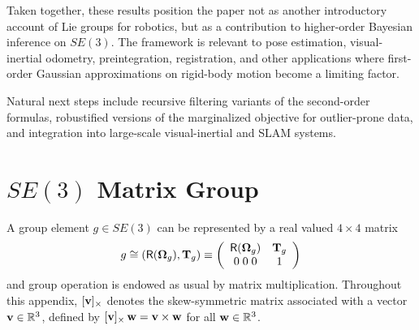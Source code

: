 \documentclass[journal]{IEEEtran}
\newcommand{\real}{\mathbb{R}}
\newcommand{\bfOmega}{\boldsymbol{\Omega}}
\newcommand{\beq}{\begin{equation}}
\newcommand{\eeq}{\end{equation}}
\begin{document}
Taken together, these results position the paper not as another
introductory account of Lie groups for robotics, but as a
contribution to higher-order Bayesian inference on $SE(3)$.
The framework is relevant to pose estimation, visual-inertial
odometry, preintegration, registration, and other applications
where first-order Gaussian approximations on rigid-body
motion become a limiting factor.
 
Natural next steps include recursive filtering variants of the
second-order formulas, robustified versions of the marginalized
objective for outlier-prone data, and integration into large-scale
visual-inertial and SLAM systems.

\appendix

\section{$SE(3)$ Matrix Group}
\label{app:SE3group}
A group element $g\in SE(3)$ can be represented by a real valued $4\times 4$ matrix
\beq
    g \cong (\mathsf{R}(\bfOmega_g),{\bf T}_g) \equiv \left(
    \begin{array}{cc}
        \mathsf{R}(\bfOmega_g) & {\bf T}_g \\
        0\; 0\; 0 & 1
    \end{array} \right) \label{eq:SE3matrixrepresentation}
\eeq
and group operation is endowed as usual by matrix multiplication.
Throughout this appendix, $[{\bf v}]_\times$ denotes the skew-symmetric matrix associated
with a vector ${\bf v}\in\real^3$, defined by $[{\bf v}]_\times\,{\bf w} = {\bf v}\times{\bf w}$
for all ${\bf w}\in\real^3$.
\end{document}
